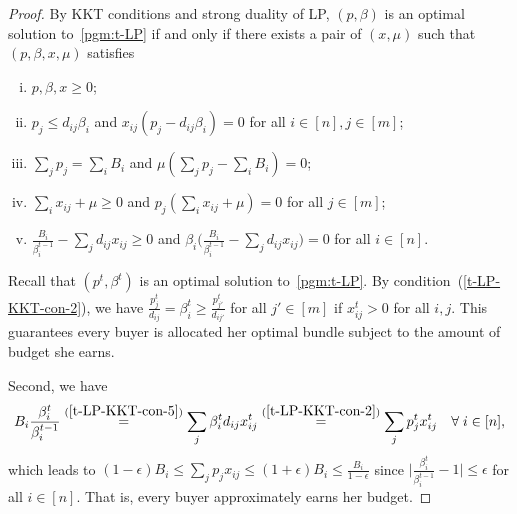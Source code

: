 \documentclass[format=acmsmall,authorversion]{acmart}
\newcommand\pcref[1]{(\cref{#1})}
\begin{document}
\begin{proof}
    By KKT conditions and strong duality of LP, $(p, \beta)$ is an optimal solution to~\cref{pgm:t-LP} if and only if there exists a pair of $(x, \mu)$ such that $(p, \beta, x, \mu)$ satisfies 
    \begin{enumerate}[(i)]
        \item $p, \beta, x \geq 0$; \label{t-LP-KKT-con-1}
        \item $p_j \leq d_{ij} \beta_i$ and $x_{ij} \left( p_j - d_{ij} \beta_i \right) = 0$ for all $i \in [n], j \in [m]$; \label{t-LP-KKT-con-2}
        \item $\sum_j p_j = \sum_i B_i$ and $\mu \left( \sum_j p_j - \sum_i B_i \right) = 0$; \label{t-LP-KKT-con-3}
        \item $\sum_i x_{ij} + \mu \geq 0$ and $p_j \left( \sum_i x_{ij} + \mu \right) = 0$ for all $j \in [m]$; \label{t-LP-KKT-con-4}
        \item $\frac{B_i}{\beta^{t-1}_i} - \sum_j d_{ij} x_{ij} \geq 0$ and $\beta_i \big( \frac{B_i}{\beta^{t-1}_i} - \sum_j d_{ij} x_{ij} \big) = 0$ for all $i \in [n]$.\label{t-LP-KKT-con-5}
    \end{enumerate}

    Recall that $(p^t, \beta^t)$ is an optimal solution to~\cref{pgm:t-LP}.
    By condition~\pcref{t-LP-KKT-con-2}, we have $\frac{p^t_j}{d_{ij}} = \beta^t_i \geq \frac{p^t_{j'}}{d_{ij'}}$ for all $j' \in [m]$ if $x^t_{ij} > 0$ for all $i, j$. 
    This guarantees every buyer is allocated her optimal bundle subject to the amount of budget she earns. 
    
    Second, we have 
    \begin{equation}
        B_i \frac{\beta^t_i}{\beta^{t-1}_i} \overset{\pcref{t-LP-KKT-con-5}}{=} \sum_j \beta^t_i d_{ij} x^t_{ij} \overset{\pcref{t-LP-KKT-con-2}}{=} \sum_j p^t_j x^t_{ij} \quad \forall\; i \in [n], 
        \label{eq:approx-earn-budget}
    \end{equation}
    which leads to $(1 - \epsilon) B_i \leq \sum_j p_j x_{ij} \leq (1 + \epsilon) B_i \leq \frac{B_i}{1 - \epsilon}$ since $\big| \frac{\beta^t_i}{\beta^{t-1}_i} - 1 \big| \leq \epsilon$ for all $i \in [n]$. That is, every buyer approximately earns her budget.
    

\end{proof}
\end{document}
